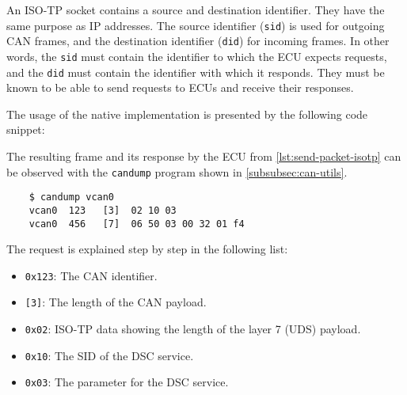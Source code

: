 An ISO-TP socket contains a source and destination identifier. They have the same purpose as IP addresses. The source identifier (\texttt{sid}) is used for outgoing CAN frames, and the destination identifier (\texttt{did}) for incoming frames. In other words, the \texttt{sid} must contain the identifier to which the ECU expects requests, and the \texttt{did} must contain the identifier with which it responds. They must be known to be able to send requests to ECUs and receive their responses.

The usage of the native implementation is presented by the following code snippet:


The resulting frame and its response by the ECU from \autoref{lst:send-packet-isotp} can be observed with the \texttt{candump} program shown in \autoref{subsubsec:can-utils}. 

\begin{samepage}
\begin{verbatim}
    $ candump vcan0
    vcan0  123   [3]  02 10 03
    vcan0  456   [7]  06 50 03 00 32 01 f4
\end{verbatim}
\end{samepage}

The request is explained step by step in the following list:

\begin{itemize}
    \item \texttt{0x123}: The CAN identifier.
    \item \texttt{[3]}: The length of the CAN payload.
    \item \texttt{0x02}: ISO-TP data showing the length of the layer 7 (UDS) payload.
    \item \texttt{0x10}: The SID of the DSC service.
    \item \texttt{0x03}: The parameter for the DSC service.
\end{itemize}
